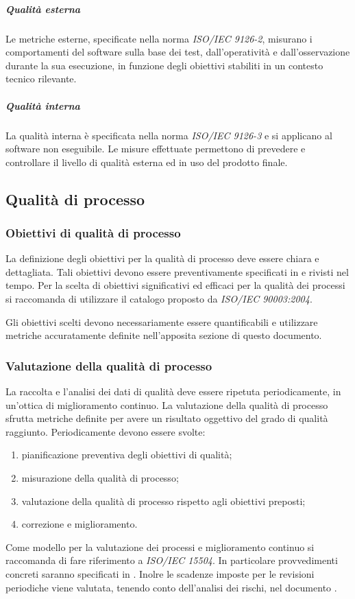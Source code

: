 \documentclass[12pt,a4paper]{article}
\begin{document}
	\subparagraph{Qualità esterna}
	Le metriche esterne, specificate nella norma \textit{ISO/IEC 9126-2}, misurano i comportamenti del software sulla base dei test, dall'operatività e dall'osservazione durante la sua esecuzione, in funzione degli obiettivi stabiliti in un contesto tecnico rilevante.
	
	\subparagraph{Qualità interna}
	La qualità interna è specificata nella norma \textit{ISO/IEC 9126-3} e si applicano al software non eseguibile. Le misure effettuate permettono di prevedere e controllare il livello di qualità esterna ed in uso del prodotto finale.
	
	\subsection{Qualità di processo}
	
	\subsubsection{Obiettivi di qualità di processo}
    La definizione degli obiettivi per la qualità di processo deve essere chiara e dettagliata. 
    Tali obiettivi devono essere preventivamente specificati in \NdP{} e rivisti nel tempo. 
    Per la scelta di obiettivi significativi ed efficaci per la qualità dei processi si raccomanda di utilizzare il catalogo proposto da\textit{ ISO/IEC 90003:2004}.
    
    Gli obiettivi scelti devono necessariamente essere quantificabili e utilizzare metriche accuratamente definite nell'apposita sezione di questo documento.    
	
	\subsubsection{Valutazione della qualità di processo}
	La raccolta e l'analisi dei dati di qualità deve essere ripetuta periodicamente, in un'ottica di miglioramento continuo. La valutazione della qualità di processo sfrutta metriche  definite per avere un risultato oggettivo del grado di qualità raggiunto. Periodicamente devono essere svolte:
	\begin{enumerate}
		\item pianificazione preventiva degli obiettivi di qualità;
		\item misurazione della qualità di processo;
		\item valutazione della qualità di processo rispetto agli obiettivi preposti;
		\item correzione e miglioramento.
	\end{enumerate}
	Come modello per la valutazione dei processi e miglioramento continuo si raccomanda di fare riferimento a \textit{ISO/IEC 15504}.
	In particolare provvedimenti concreti saranno specificati in \NdP{}. 
	Inolre le scadenze imposte per le revisioni periodiche viene valutata, tenendo  conto dell'analisi dei rischi, nel documento \PdP{}.
\end{document}
